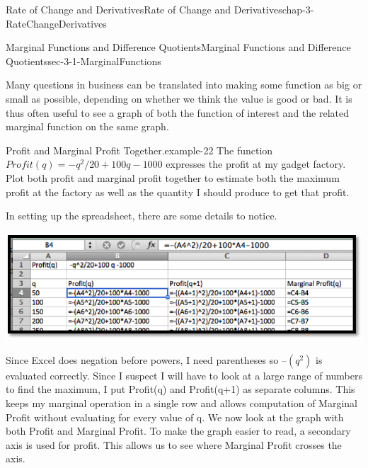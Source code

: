 \documentclass[oneside,10pt,]{book}
\numberwithin{equation}{section}
\begin{document}
\begin{chapterptx}{Rate of Change and Derivatives}{}{Rate of Change and Derivatives}{}{}{chap-3-RateChangeDerivatives}
\begin{sectionptx}{Marginal Functions and Difference Quotients}{}{Marginal Functions and Difference Quotients}{}{}{sec-3-1-MarginalFunctions}
\par
\hypertarget{p-917}{}%
Many questions in business can be translated into making some function as big or small as possible, depending on whether we think the value is good or bad.  It is thus often useful to see a graph of both the function of interest and the related marginal function on the same graph.%
\begin{example}{Profit and Marginal Profit Together.}{example-22}%
\hypertarget{p-918}{}%
The function \(Profit(q)=-q^2/20+100q-1000 \) expresses the profit at my gadget factory.  Plot both profit and marginal profit together to estimate both the maximum profit at the factory as well as the quantity I should produce to get that profit.%
\par
\hypertarget{p-919}{}%
In setting up the spreadsheet, there are some details to notice.%
\begin{sidebyside}{1}{0.15}{0.15}{0}%
\begin{sbspanel}{0.7}%
\includegraphics[width=1\linewidth]{images/sec3-1-4.png}
\end{sbspanel}%
\end{sidebyside}%
\par
\hypertarget{p-920}{}%
Since Excel does negation before powers, I need parentheses so \(–(q^2)\) is evaluated correctly.  Since I suspect I will have to look at a large range of numbers to find the maximum, I put Profit(q) and Profit(q+1) as separate columns.  This keeps my marginal operation in a single row and allows computation of Marginal Profit without evaluating for every value of q.  We now look at the graph with both Profit and Marginal Profit.  To make the graph easier to read, a secondary axis is used for profit.  This allows us to see where Marginal Profit crosses the axis.%
\begin{sidebyside}{1}{0.15}{0.15}{0}%
\begin{sbspanel}{0.7}%

\end{sbspanel}
\end{sidebyside}
\end{example}
\end{sectionptx}
\end{chapterptx}
\end{document}
